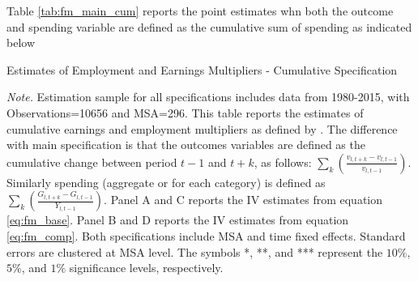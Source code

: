 \documentclass[dv_diss_main.tex]{subfiles}
\begin{document}
\newpage
Table \ref{tab:fm_main_cum} reports the point estimates whn both the outcome and spending variable are defined as the cumulative sum of spending as indicated below 
\begin{table}[H]
    \begin{center}
    
    \caption{Estimates of Employment and Earnings Multipliers - Cumulative Specification}\label{tab:fm_main_cum}

	\resizebox*{0.9\textwidth}{!}	{
    
    }
    \end{center}
    \footnotesize {
    \textit{Note. } Estimation sample for all specifications includes data from 1980-2015, with Observations=10656 and MSA=296. This table reports the estimates of cumulative earnings and employment multipliers as defined by \cite{ramey2018government}. The difference with main specification is that the outcomes variables are defined as the cumulative change between period $t-1$ and $t+k$, as follows: $\sum_{k}(\frac{v_{l,t+k}-v_{l,t-1}}{v_{l,t-1}})$. Similarly spending (aggregate or for each category) is defined as $\sum_{k}(\frac{G_{l,t+k}-G_{l,t-1}}{Y_{l,t-1}})$. Panel A and C reports the IV estimates from equation \eqref{eq:fm_base}. Panel B and D reports the IV estimates from equation \eqref{eq:fm_comp}. Both specifications include MSA and time fixed effects.  Standard errors are clustered at MSA level. The symbols *, **, and *** represent the $10\%$, $5\%$, and $1\%$ significance levels, respectively.}

\end{table}
\newpage

\end{document}
